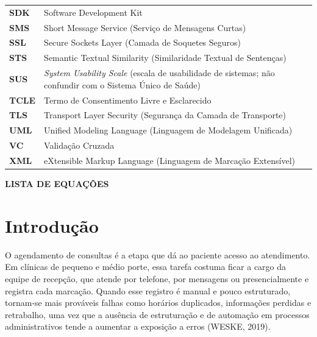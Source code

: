 \documentclass[12pt,a4paper]{extarticle}
\begin{document}
\begin{xltabular}{\textwidth}{@{}p{1.6cm}Y@{}}
\textbf{SDK} & Software Development Kit \\
\textbf{SMS} & Short Message Service (Serviço de Mensagens Curtas) \\
\textbf{SSL} & Secure Sockets Layer (Camada de Soquetes Seguros) \\
\textbf{STS} & Semantic Textual Similarity (Similaridade Textual de Sentenças) \\
\textbf{SUS} & \textit{System Usability Scale} (escala de usabilidade de sistemas; não confundir com o Sistema Único de Saúde) \\
\textbf{TCLE} & Termo de Consentimento Livre e Esclarecido \\
\textbf{TLS} & Transport Layer Security (Segurança da Camada de Transporte) \\
\textbf{UML} & Unified Modeling Language (Linguagem de Modelagem Unificada) \\
\textbf{VC} & Validação Cruzada \\
\textbf{XML} & eXtensible Markup Language (Linguagem de Marcação Extensível) \\
\end{xltabular}
\addtocounter{table}{-1}%


\newpage

\begin{center}
    {\Large\textbf{LISTA DE EQUAÇÕES}}
\end{center}

\vspace{0.5cm}

\makeatletter
{}
\makeatother


\newpage
\renewcommand{\contentsname}{\centerline{SUMÁRIO}}
\setlength{\cftbeforesecskip}{0.5em}%
\tableofcontents

\newpage
\let\thispagestyle\estiloOriginal
\pagestyle{plain}%
\onehalfspacing

\section{Introdução}
\label{cap:intro}
O agendamento de consultas é a etapa que dá ao paciente acesso ao atendimento. Em clínicas de pequeno e médio porte, essa tarefa costuma ficar a cargo da equipe de recepção, que atende por telefone, por mensagens ou presencialmente e registra cada marcação. Quando esse registro é manual e pouco estruturado, tornam-se mais prováveis falhas como horários duplicados, informações perdidas e retrabalho, uma vez que a ausência de estruturação e de automação em processos administrativos tende a aumentar a exposição a erros (WESKE, 2019).
\end{document}
